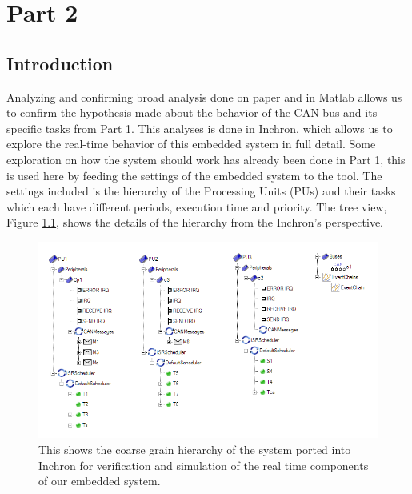 \chapter{Part 2}


\section{Introduction}

Analyzing and confirming broad analysis done on paper and in Matlab allows us to confirm the hypothesis made about the behavior of the CAN bus and its specific tasks from Part 1. This analyses is done in Inchron, which allows us to explore the real-time behavior of this embedded system in full detail. Some exploration on how the system should work has already been done in Part 1, this is used here by feeding the settings of the embedded system to the tool. The settings included is the hierarchy of the Processing Units (PUs) and their tasks which each have different periods, execution time and priority. The tree view, Figure \ref{fig:treeCAN}, shows the details of the hierarchy from the Inchron's perspective.

\begin{figure}[h!]
	\begin{center}
		\includegraphics[width=0.75\linewidth]{img/treeCAN}
		\caption{This shows the coarse grain hierarchy of the system ported into Inchron for verification and simulation of the real time components of our embedded system.}
		\label{fig:treeCAN}
	\end{center}
\end{figure}





